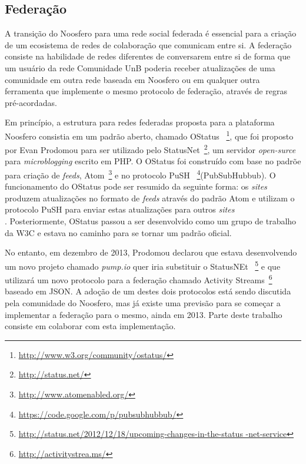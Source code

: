 
\subsection{Federação}

A transição do Noosfero para uma rede social federada é essencial para a criação
de um ecosistema de redes de colaboração que comunicam entre si. A federação
consiste na habilidade de redes diferentes de conversarem entre si de forma que
um usuário da rede Comunidade UnB poderia receber atualizações de uma comunidade
em outra rede baseada em Noosfero ou em qualquer outra ferramenta que implemente
o mesmo protocolo de federação, através de regras pré-acordadas.

Em princípio, a estrutura para redes federadas proposta para a plataforma Noosfero
consistia em um padrão aberto, chamado OStatus
~\footnote{\url{http://www.w3.org/community/ostatus/}}, que foi proposto
por Evan Prodomou para ser utilizado pelo StatusNet~\footnote{\url{
http://status.net/}}, um servidor  \textit{open-surce} para
\textit{microblogging} escrito em PHP.
%
O OStatus foi construído com base no padrõe para criação de \textit{feeds},
Atom~\footnote{\url{http://www.atomenabled.org/}} e no protocolo PuSH
~\footnote{\url{https://code.google.com/p/pubsubhubbub/}}(PubSubHubbub).
O funcionamento do OStatus pode ser resumido da seguinte forma:
os \textit{sites} produzem atualizações no formato de \textit{feeds} através
do padrão Atom e utilizam o protocolo PuSH para enviar estas atualizações
para outros \textit{sites} \\
\cite{OStatusBasics}.
%
Posteriormente, OStatus passou a ser desenvolvido como um grupo de trabalho
da W3C e estava no caminho para se tornar um padrão oficial. 

No entanto, em dezembro de 2013, Prodomou declarou que estava desenvolvendo
um novo projeto chamado \textit{pump.io} quer iria substituir o StatusNEt
~\footnote{\url{http://status.net/2012/12/18/upcoming-changes-in-the-status
-net-service}} e que utilizará um novo protocolo para a federação chamado
Activity Streams~\footnote{\url{http://activitystrea.ms/}} baseado em JSON.
A adoção de um destes dois protocolos está sendo discutida pela comunidade do
Noosfero, mas já existe uma previsão para se começar a implementar a federação
para o mesmo, ainda em 2013. Parte deste trabalho consiste em colaborar com esta
implementação.

